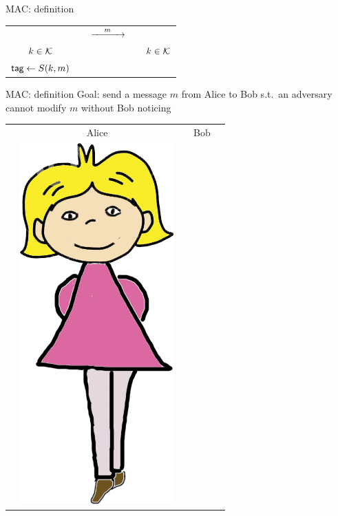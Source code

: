 \documentclass[usenames,dvipsnames, 9pt]{beamer}
\begin{document}
\begin{frame}{MAC: definition}
\begin{center}
\begin{tabular}{c c c c c}
			&  & \Huge $\xrightarrow{\mkern25mu m \mkern25mu}$ & &  \\ 
			\pause
			\LARGE $k \in \mathcal{K}$ &   & &  & $k \in \mathcal{K}$ \\[10pt]
			\pause
			$\textsf{tag} \leftarrow S(k,m)$   & & &  &  \\ 
		\end{tabular}
	\end{center}
\end{frame}

\begin{frame}{MAC: definition}
\Large
Goal: send a message $m$ from Alice to Bob s.t.\ an adversary cannot modify $m$ without Bob noticing \\[5pt]
\begin{center}
	\begin{tabular}{c c c c c}
		& Alice  & & Bob &  \\
		& \multirow{5}{*}{\includegraphics[scale=0.18]{Alice}} & &

\end{tabular}
\end{center}
\end{frame}
\end{document}
